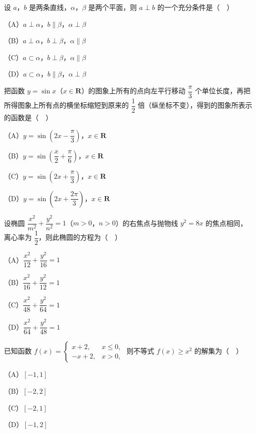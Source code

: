\begin{question}
设 $a$，$b$ 是两条直线，$\alpha$，$\beta$ 是两个平面，则 $a\perp b$ 的一个充分条件是（　）

（A）$a\perp\alpha$，$b\parallel\beta$，$\alpha\perp\beta$

（B）$a\perp\alpha$，$b\perp\beta$，$\alpha\parallel\beta$

（C）$a\subset\alpha$，$b\perp\beta$，$\alpha\parallel\beta$

（D）$a\subset\alpha$，$b\parallel\beta$，$\alpha\perp\beta$

\end{question}
\begin{question}
把函数 $y=\sin x$（$x\in\mathbf R$）的图象上所有的点向左平行移动 $\dfrac{\pi}3$ 个单位长度，再把所得图象上所有点的横坐标缩短到原来的 $\dfrac12$ 倍（纵坐标不变），得到的图象所表示的函数是（　）

（A）$y=\sin\left(2x-\dfrac{\pi}3\right)$，$x\in\mathbf R$

（B）$y=\sin\left(\dfrac x2+\dfrac{\pi}6\right)$，$x\in\mathbf R$

（C）$y=\sin\left(2x+\dfrac{\pi}3\right)$，$x\in\mathbf R$

（D）$y=\sin\left(2x+\dfrac{2\pi}3\right)$，$x\in\mathbf R$

\end{question}
\begin{question}
设椭圆 $\dfrac{x^2}{m^2}+\dfrac{y^2}{n^2}=1$（$m>0$，$n>0$）的右焦点与抛物线 $y^2=8x$ 的焦点相同，离心率为 $\dfrac12$，则此椭圆的方程为（　）

（A）$\dfrac{x^2}{12}+\dfrac{y^2}{16}=1$

（B）$\dfrac{x^2}{16}+\dfrac{y^2}{12}=1$

（C）$\dfrac{x^2}{48}+\dfrac{y^2}{64}=1$

（D）$\dfrac{x^2}{64}+\dfrac{y^2}{48}=1$

\end{question}
\begin{question}
已知函数 $f(x)=\begin{cases}x+2,&x\leqslant0,\\ -x+2,&x>0,\end{cases}$ 则不等式 $f(x)\geqslant x^2$ 的解集为（　）

（A）$[-1,1]$

（B）$[-2,2]$

（C）$[-2,1]$

（D）$[-1,2]$

\end{question}
